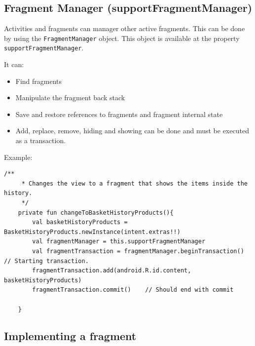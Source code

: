 \subsection{Fragment Manager (supportFragmentManager)}
Activities and fragments can manager other active fragments. This can be done by using the 
\texttt{FragmentManager} object. This object is available at the property \texttt{supportFragmentManager}. 

It can:
\begin{itemize}
    \item Find fragments
    \item Manipulate the fragment back stack
    \item Save and restore references to fragments and fragment internal state
    \item Add, replace, remove, hiding and showing can be done and must be executed as a transaction.   
\end{itemize}

Example:

\begin{lstlisting}[title=Fragment transaction]
    /**
     * Changes the view to a fragment that shows the items inside the history.
     */
    private fun changeToBasketHistoryProducts(){
        val basketHistoryProducts = BasketHistoryProducts.newInstance(intent.extras!!)
        val fragmentManager = this.supportFragmentManager
        val fragmentTransaction = fragmentManager.beginTransaction()    // Starting transaction.
        fragmentTransaction.add(android.R.id.content, basketHistoryProducts)
        fragmentTransaction.commit()    // Should end with commit

    }
\end{lstlisting}

\subsection{Implementing a fragment}

